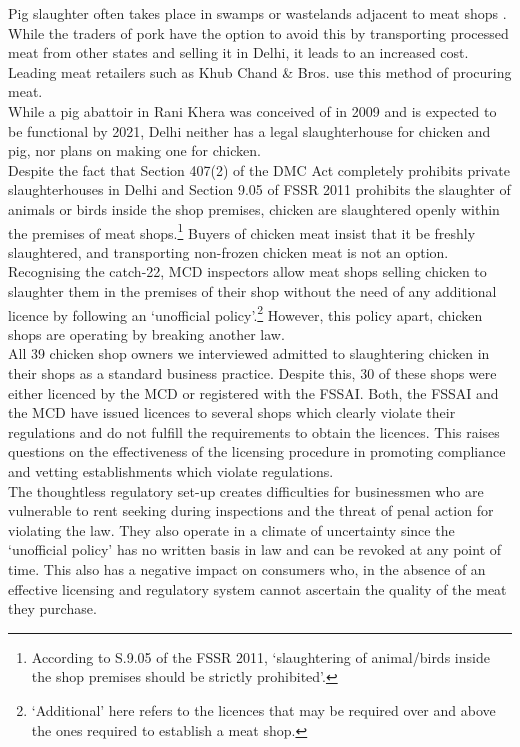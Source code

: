 \documentclass[a4paper, 12pt]{article}
\begin{document}
Pig slaughter often takes place in swamps or wastelands adjacent to meat shops \parencite{tnnnews}. While the traders of pork have the option to avoid this by transporting processed meat from other states and selling it in Delhi, it leads to an increased cost. Leading meat retailers such as Khub Chand \& Bros. use this method of procuring meat.\\

While a pig abattoir in Rani Khera was conceived of in 2009 and is expected to be functional by 2021, Delhi neither has a legal slaughterhouse for chicken and pig, nor plans on making one for chicken. \\

Despite the fact that Section 407(2) of the DMC Act completely prohibits private slaughterhouses in Delhi and Section 9.05 of FSSR 2011 prohibits the slaughter of animals or birds inside the shop premises, chicken are slaughtered openly within the premises of meat shops.\footnote{According to S.9.05 of the FSSR 2011, ‘slaughtering of animal/birds inside the shop premises should be strictly prohibited’.} Buyers of chicken meat insist that it be freshly slaughtered, and transporting non-frozen chicken meat is not an option.\\

Recognising the catch-22, MCD inspectors allow meat shops selling chicken to slaughter them in the premises of their shop without the need of any additional licence by following an ‘unofficial policy’.\footnote{‘Additional’ here refers to the licences that may be required over and above the ones required to establish a meat shop.} However, this policy apart, chicken shops are operating by breaking another law. \\

All 39 chicken shop owners we interviewed admitted to slaughtering chicken in their shops as a standard business practice. Despite this, 30 of these shops were either licenced by the MCD or registered with the FSSAI. Both, the FSSAI and the MCD have issued licences to several shops which clearly violate their regulations and do not fulfill the requirements to obtain the licences. This raises questions on the effectiveness of the licensing procedure in promoting compliance and vetting establishments which violate regulations. \\

The thoughtless regulatory set-up creates difficulties for businessmen who are vulnerable to rent seeking during inspections and the threat of penal action for violating the law. They also operate in a climate of uncertainty since the ‘unofficial policy’ has no written basis in law and can be revoked at any point of time. This also has a negative impact on consumers who, in the absence of an effective licensing and regulatory system cannot ascertain the quality of the meat they purchase. \\
\end{document}

